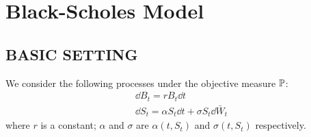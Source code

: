 \section{Black-Scholes Model}

\subsection*{BASIC SETTING}
We consider the following processes under the objective measure $\mathbb{P}$:
	\begin{align*}
	&\dd B_t = rB_t \dd t  \\ 
	& \dd S_t = \alpha S_t \dd t + \sigma S_t \dd \bar{W}_t  \tag{S}
	\end{align*}
where $r$ is a constant; $\alpha$ and $\sigma$ are $\alpha(t, S_t)$ and $\sigma(t, S_t)$ respectively.
	

